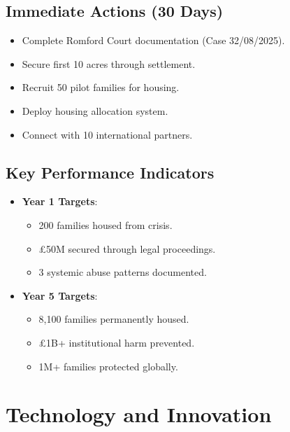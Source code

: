 \documentclass[12pt]{article}\usepackage[a4paper,margin=1in]{geometry}
\begin{document}
\subsection*{Immediate Actions (30 Days)}
\begin{itemize}
    \item Complete Romford Court documentation (Case 32/08/2025).
    \item Secure first 10 acres through settlement.
    \item Recruit 50 pilot families for housing.
    \item Deploy housing allocation system.
    \item Connect with 10 international partners.
\end{itemize}\subsection*{Key Performance Indicators}
\begin{itemize}
    \item \textbf{Year 1 Targets}:
        \begin{itemize}
            \item 200 families housed from crisis.
            \item £50M secured through legal proceedings.
            \item 3 systemic abuse patterns documented.
        \end{itemize}
    \item \textbf{Year 5 Targets}:
        \begin{itemize}
            \item 8,100 families permanently housed.
            \item £1B+ institutional harm prevented.
            \item 1M+ families protected globally.
        \end{itemize}
\end{itemize}\section*{Technology and Innovation}
\end{document}
